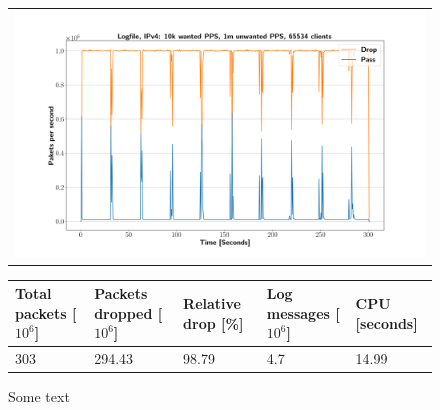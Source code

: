 \begin{figure}[p]
	\label{fig:simplefail2ban:disk:ip4:1m}
	\centering
	\scriptsize
	\begin{tabular}{c}
    	\centerline{\includegraphics[width=1.2\textwidth]{images/simplefail2ban_disk_ipv4_v10k_iv1m_c65534.png}}
    \end{tabular}
	\begin{tabular}{lllll}
		\toprule
		\textbf{Total packets [$10^6$]} & \textbf{Packets dropped [$10^6$]} & \textbf{Relative drop [\%]} & \textbf{Log messages [$10^6$]} & \textbf{CPU [seconds]} \\ \midrule 
		303 & 294.43 & 98.79 & 4.7 & 14.99 \\
		\bottomrule
	\end{tabular}
	\caption[Simplefail2ban, Logfile IPv4, 1m \ac{PPS}]{Some text}
\end{figure}

